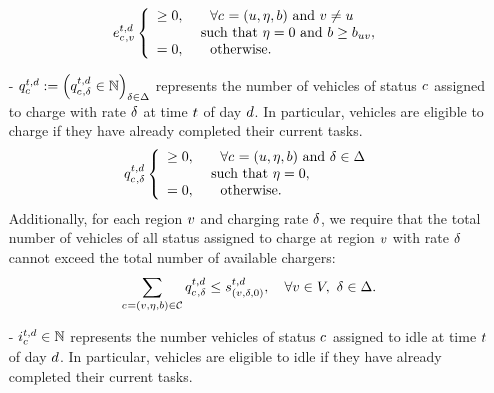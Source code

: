 \begin{itemize}
    \begin{align} \label{eq:setup-rerouting-flow}
        e^{t,d}_{c_{}, v} \left\{
        \begin{array}{ll}
            \geq 0, & \quad \text{$\forall c_{} = (u, \eta, b)$ and $v \neq u$}\\
            &\text{ such that $\eta = 0$ and 
            $b \geq b_{u v}$}, \\
            = 0, & \quad \text{otherwise.}
        \end{array}
        \right.
    \end{align}
    \item[-] \emph{$q^{t,d}_{c_{}} := \left(q^{t,d}_{c_{}, \delta} \in \mathbb{N} \right)_{\delta \in \Delta}$} represents the number of vehicles of status $c_{}$ assigned to charge with rate $\delta$ at time $t$ of day $d$. In particular, vehicles are eligible to charge if they have already completed their current tasks.
    \begin{align} \label{eq:setup-charging-flow}
        q^{t,d}_{c_{}, \delta} \left\{
        \begin{array}{ll}
            \geq 0, & \quad \text{$\forall c_{} = (u, \eta, b)$ and $\delta \in \Delta$}\\
            &\text{ such that $\eta = 0$}, \\
            = 0, & \quad \text{otherwise.}
        \end{array}
        \right.
    \end{align}
    Additionally, for each region $v$ and charging rate $\delta$, we require that the total number of vehicles of all status assigned to charge at region $v$ with rate $\delta$ cannot exceed the total number of available chargers:
    \begin{equation} \label{eq:setup-charging-cap}
        \sum_{c_{} = (v, \eta, b) \in \mathcal{C}} q^{t,d}_{c_{}, \delta} \leq s_{(v, \delta, 0)}^{t, d},\quad \forall v \in V,\  \delta \in \Delta.
    \end{equation}
    \item[-] \emph{$i^{t,d}_{c_{}} \in \mathbb{N}$} represents the number vehicles of status $c_{}$ assigned to idle at time $t$ of day $d$. In particular, vehicles are eligible to idle if they have already completed their current tasks.

\end{itemize}
